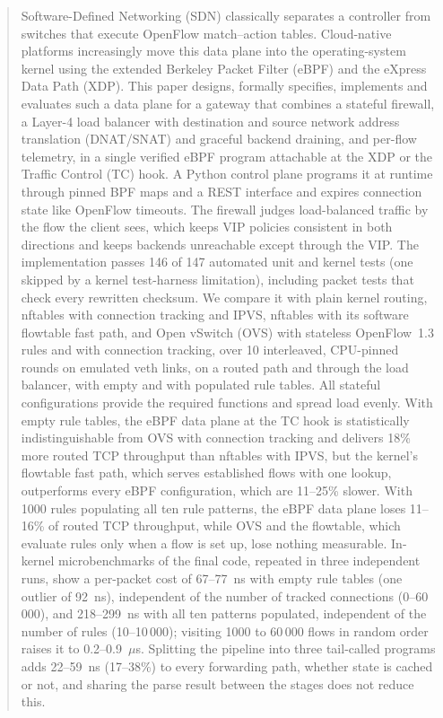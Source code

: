\documentclass[conference]{IEEEtran}
\begin{document}
\begin{abstract}
Software-Defined Networking (SDN) classically separates a controller from
switches that execute OpenFlow match--action tables. Cloud-native platforms
increasingly move this data plane into the operating-system kernel using the
extended Berkeley Packet Filter (eBPF) and the eXpress Data Path (XDP). This
paper designs, formally specifies, implements and evaluates such a data plane
for a gateway that combines a stateful firewall, a Layer-4 load balancer with
destination and source network address translation (DNAT/SNAT) and graceful
backend draining, and per-flow telemetry, in a single verified eBPF program
attachable at the XDP or the Traffic Control (TC) hook. A Python control plane
programs it at runtime through pinned BPF maps and a REST interface and
expires connection state like OpenFlow timeouts. The firewall judges
load-balanced traffic by the flow the client sees, which keeps VIP policies
consistent in both directions and keeps backends unreachable except through
the VIP. The implementation passes 146 of 147 automated unit and kernel tests
(one skipped by a kernel test-harness limitation), including packet tests
that check every rewritten checksum. We compare it with plain kernel routing,
nftables with connection tracking and IPVS, nftables with its software
flowtable fast path, and Open vSwitch (OVS) with stateless OpenFlow~1.3 rules
and with connection tracking, over 10 interleaved, CPU-pinned rounds on
emulated veth links, on a routed path and through the load balancer, with
empty and with populated rule tables. All stateful configurations provide the
required functions and spread load evenly. With empty rule tables, the eBPF
data plane at the TC hook is statistically indistinguishable from OVS with
connection tracking and delivers 18\% more routed TCP throughput than
nftables with IPVS, but the kernel's flowtable fast path, which serves
established flows with one lookup, outperforms every eBPF configuration,
which are 11--25\% slower. With 1000 rules populating all ten rule patterns, the eBPF
data plane loses 11--16\% of routed TCP throughput, while OVS and the
flowtable, which evaluate rules only when a flow is set up, lose nothing
measurable. In-kernel microbenchmarks of the final code, repeated in three
independent runs, show a per-packet cost of 67--77~ns with empty rule tables
(one outlier of 92~ns), independent of the number of tracked connections
(0--60\,000), and 218--299~ns with all ten patterns populated, independent of
the number of rules (10--10\,000); visiting 1000 to 60\,000 flows in random
order raises it to 0.2--0.9~$\mu$s. Splitting the pipeline into three
tail-called programs adds 22--59~ns (17--38\%) to every forwarding path,
whether state is cached or not, and sharing the parse result between the
stages does not reduce this.
\end{abstract}
\end{document}
